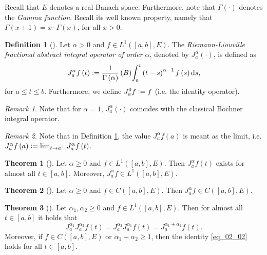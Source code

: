 \documentclass[reqno]{amsart}
\numberwithin{equation}{section}
\theoremstyle{definition}
\newtheorem{definition}{Definition}
\newtheorem{theorem}{Theorem}
\theoremstyle{remark}
\newtheorem{remark}{Remark}
\newcommand{\Bint}[3]{\br{B}\!\displaystyle\int_{#1}^{#2}{#3}}
\newcommand{\br}[1]{\left(#1\right)}
\newcommand{\C}[2]{C\br{#1,#2}}
\newcommand{\definitionRef}[1]{\textrm{Definition \ref{#1}}}
\newcommand{\defeq}{\vcentcolon=}
\newcommand{\ds}{\mathrm{d}s}
\newcommand{\JRL}[3]{J^{#1}_{#2}{#3}}
\newcommand{\LOne}[2]{L^1\br{#1,#2}}
\newcommand{\sbr}[1]{\left[#1\right]}
\begin{document}
	Recall that $E$ denotes a real Banach space. Furthermore, note that $\Gamma\br{\cdot}$ denotes the \textit{Gamma function}. Recall its well known property, namely that $\Gamma\br{x+1}=x\cdot\Gamma\br{x}$, for all $x>0$. 
	\begin{definition}[]\label{def_01}
		Let $\alpha>0$ and $f\in\LOne{\sbr{a,b}}{E}$. The \textit{Riemann-Liouville fractional abstract integral operator of order $\alpha$}, denoted by $\JRL{\alpha}{a}{\br{\cdot}}$, is defined as
		\begin{equation*}
			\JRL{\alpha}{a}{f}\br{t}\defeq\frac{1}{\Gamma\br{\alpha}}\Bint{a}{t}{\br{t-s}^{\alpha-1}f\br{s}\ds},
		\end{equation*}
		for $a\leq{t}\leq{b}$. Furthermore, we define $\JRL{0}{a}{f}\defeq{f}$ (i.e. the identity operator).
	\end{definition}
	\begin{remark}
		Note that for $\alpha=1$, $\JRL{\alpha}{a}{\br{\cdot}}$ coincides with the classical Bochner integral operator.
	\end{remark}
	\begin{remark}\label{rem_01}
		Note that in \definitionRef{def_01}, the value $\JRL{\alpha}{a}{f}\br{a}$ is meant as the limit, i.e. $\JRL{\alpha}{a}{f}\br{a}\defeq\lim_{t\rightarrow{a^+}}\JRL{\alpha}{a}{f}\br{t}$.
	\end{remark}
	\begin{theorem}[]
		Let $\alpha\geq0$ and $f\in\LOne{\sbr{a,b}}{E}$. Then $\JRL{\alpha}{a}{f}\br{t}$ exists for almost all $t\in\sbr{a,b}$. Moreover, $\JRL{\alpha}{a}{f}\in\LOne{\sbr{a,b}}{E}$.
	\end{theorem}
	\begin{theorem}[]\label{thm_05}
		Let $\alpha\geq0$ and $f\in\C{\sbr{a,b}}{E}$. Then $\JRL{\alpha}{a}{f}\in\C{\sbr{a,b}}{E}$.
	\end{theorem}
	\begin{theorem}[]\label{thm_06}
		Let $\alpha_1,\alpha_2\geq0$ and $f\in\LOne{\sbr{a,b}}{E}$. Then for almost all $t\in\sbr{a,b}$ it holds that
		\begin{equation}\label{eq_02_02}
			\JRL{\alpha_1}{a}{\JRL{\alpha_2}{a}{f}}\br{t}=\JRL{\alpha_2}{a}{\JRL{\alpha_1}{a}{f}}\br{t}=\JRL{\alpha_1+\alpha_2}{a}{f}\br{t}.
		\end{equation}
		Moreover, if $f\in\C{\sbr{a,b}}{E}$ or $\alpha_1+\alpha_2\geq1$, then the identity \eqref{eq_02_02} holds for all $t\in\sbr{a,b}$.
	\end{theorem}
\end{document}
